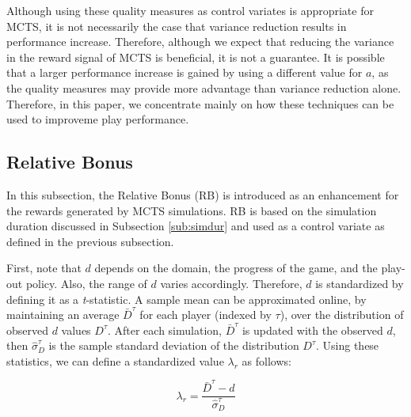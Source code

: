 \documentclass{ecai2014}
\begin{document}
Although using these quality measures as control variates is appropriate for MCTS, it is not necessarily the case that variance reduction results in performance increase. Therefore, although we expect that reducing the variance in the reward signal of MCTS is beneficial, it is not a guarantee. It is possible that a larger performance increase is gained by using a different value for $a$, as the quality measures may provide more advantage than variance reduction alone. Therefore, in this paper, we concentrate mainly on how these techniques can be used to improveme play performance. 

\subsection{Relative Bonus}
\label{subsec:rb}
In this subsection, the Relative Bonus (RB) is introduced as an enhancement for the rewards generated by MCTS simulations. RB is based on the simulation duration discussed in Subsection \ref{sub:simdur} and used as a control variate as defined in the previous subsection.

First, note that $d$ depends on the domain, the progress of the game, and the play-out policy. 
Also, the range of $d$ varies accordingly. 
Therefore, $d$ is standardized by defining it as a \emph{t}-statistic. A sample mean can be approximated online, by maintaining an average $\bar{D}^\tau$ for each player (indexed by $\tau$), over the distribution of observed $d$ values $D^\tau$. After each simulation, $\bar{D}^\tau$ is updated with the observed $d$, then $\hat{\sigma}^\tau_D$ is the sample standard deviation of the distribution $D^\tau$. Using these statistics, we can define a standardized value $\lambda_r$ as follows:

\begin{equation}
\lambda_r = \frac{\bar{D}^\tau - d}{\hat{\sigma}^\tau_D}
\label{eq:rb_norm}
\end{equation}
\end{document}
